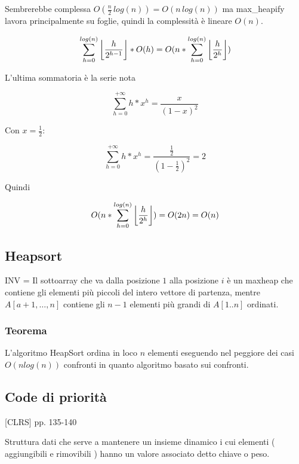 \documentclass[11pt,a4paper,twoside,openright]{book}
\DeclarePairedDelimiter\floor{\lfloor}{\rfloor}
\begin{document}
{{Sembrerebbe complessa $O(\frac{n}{2}\,log(n)) = O(n\,log(n))$ ma max\_heapify lavora principalmente su foglie, quindi la complessità è lineare $O(n)$.}

\begin{equation}
\sum_{h=0}^{log(n)}{\floor*{\frac{h}{2^{h-1}}}*O(h)} = O(n*\sum_{h=0}^{log(n)}{\floor*{\frac{h}{2^h}})}
\end{equation}

{L'ultima sommatoria è la serie nota}

\begin{equation}
\sum_{h=0}^{+\infty}{h*x^h} = \frac{x}{{(1-x)}^2}
\end{equation}

{Con $x=\frac{1}{2}$:}

\begin{equation}
\sum_{h=0}^{+\infty}{h*x^h} = \frac{\frac{1}{2}}{{(1-\frac{1}{2})}^2} = 2
\end{equation}

{Quindi}

\begin{equation}
O(n*\sum_{h=0}^{log(n)}{\floor*{\frac{h}{2^h}}}) = O(2n) = O(n)
\end{equation}

\subsection{Heapsort}



{INV = Il sottoarray che va dalla posizione $1$ alla posizione $i$ è un maxheap che contiene gli elementi più piccoli del intero vettore di partenza, mentre $A[a+1,\ldots,n]$ contiene gli $n-1$ elementi più grandi di $A[1..n]$ ordinati}{.}

\subsubsection{Teorema}

{L'algoritmo HeapSort ordina in loco $n$ elementi eseguendo nel peggiore dei casi $O(nlog(n))$ confronti in quanto algoritmo basato sui confronti.}

\subsection{Code di priorità}

{{[}CLRS{]} pp. 135-140}

{Struttura dati che serve a mantenere un insieme dinamico i cui elementi ( aggiungibili e rimovibili ) hanno un valore associato detto chiave o peso.}

}
\end{document}

